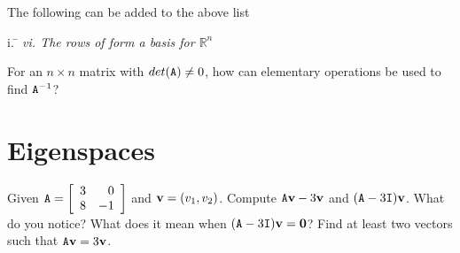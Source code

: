 \noindent {} The following can be added to the above list
    \begin{tabbing} 
	\indent   i. \quad  \= \kill 
    \indent   \em{vi.} \> \em{The rows of  form a basis for} $\mathbb{R}^n$  
    \end{tabbing} 

\vspace{.5cm}
    
\noindent   {} For an $n \times n$ matrix  with $det(\texttt{A}) \neq 0$, how can elementary operations be used to find $\texttt{A}^{-1}$?
    


\section{Eigenspaces}    \label{Eigenspaces}



\begin{myexa}[\bd{a}]
	Given $\texttt{A} = \left[ \begin{array}{rr} 3 & 0 \\ 8 & -1 \end{array} \right]$ and $\mathbf{v} = ({v_1},{v_2})$.  Compute $\texttt{A} \mathbf{v} - 3\mathbf{v}$ and $(\texttt{A} - 3 \texttt{I})\mathbf{v}$. What do you notice? What does it mean when $(\texttt{A} - 3 \texttt{I})\mathbf{v} = \mathbf{0}$? Find at least two vectors  such that $\texttt{A}\mathbf{v} = 3\mathbf{v}$.
\end{myexa}

